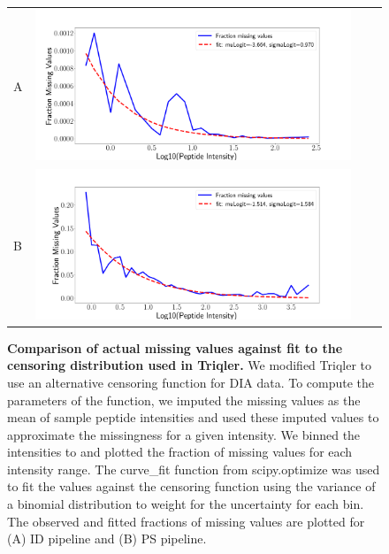 \documentclass[11pt]{article}
\begin{document}
 
\begin{figure}[hbt]
    \centering
    \centering
    \begin{tabular}{lclc} 
        A & \includegraphics[width=0.80\linewidth]{../../result/report_plots_pipeline/fraction_missing_values_ID.png} \\ %
        B & \includegraphics[width=0.80\linewidth]{../../result/report_plots_pipeline/fraction_missing_values_PS.png} \\%
    \end{tabular}
    \caption{{\bf Comparison of actual missing values against fit to the censoring distribution used in Triqler.} We modified Triqler to use an alternative censoring function for DIA data. To compute the parameters of the function, we imputed the missing values as the mean of sample peptide intensities and used these imputed values to approximate the missingness for a given intensity. We binned the intensities to and plotted the fraction of missing values for each intensity range. The curve\_fit function from scipy.optimize was used to fit the values against the censoring function using the variance of a binomial distribution to weight for the uncertainty for each bin. The observed and fitted fractions of missing values are plotted for (A) ID pipeline and (B) PS pipeline. \label{fig:fraction_missing_values}}
\end{figure}
\end{document}
